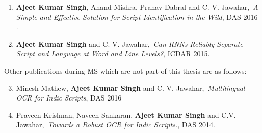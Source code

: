 \begin{enumerate}
\item \textbf{Ajeet Kumar Singh}, Anand Mishra, Pranav Dabral and C. V. Jawahar,~\textit{A Simple and Effective Solution for Script Identification in the Wild}, DAS 2016 .
\item \textbf{Ajeet Kumar Singh} and C. V. Jawahar,~\textit{Can RNNs Reliably Separate Script and Language at Word and Line Levels?}, ICDAR 2015.
\end{enumerate}

Other publications during MS which are not part of this thesis are as follows:
\begin{enumerate}
\setcounter{enumi}{2}
\item Minesh Mathew, \textbf{Ajeet Kumar Singh} and C. V. Jawahar,~\textit{Multilingual \textsc{OCR} for Indic Scripts}, DAS 2016
\item Praveen Krishnan, Naveen Sankaran, \textbf{Ajeet Kumar Singh} and C.V. Jawahar,~\textit{Towards a Robust \textsc{OCR} for Indic Scripts.}, DAS 2014.
\end{enumerate}
